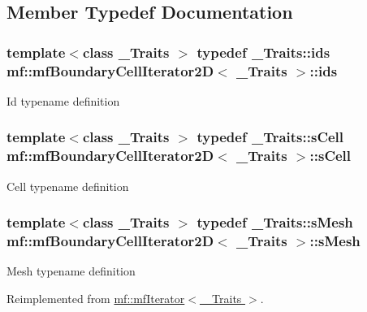 \subsection{Member Typedef Documentation}
\hypertarget{classmf_1_1mfBoundaryCellIterator2D_ac315487c67a3604069747dc93ccb2fa0}{
\subsubsection[{ids}]{\setlength{\rightskip}{0pt plus 5cm}template$<$class \_\-Traits $>$ typedef \_\-Traits::ids {\bf mf::mfBoundaryCellIterator2D}$<$ \_\-Traits $>$::{\bf ids}}}
\label{classmf_1_1mfBoundaryCellIterator2D_ac315487c67a3604069747dc93ccb2fa0}
Id typename definition \hypertarget{classmf_1_1mfBoundaryCellIterator2D_a3967d94a03a79073ae062491031e5339}{
\subsubsection[{sCell}]{\setlength{\rightskip}{0pt plus 5cm}template$<$class \_\-Traits $>$ typedef \_\-Traits::sCell {\bf mf::mfBoundaryCellIterator2D}$<$ \_\-Traits $>$::{\bf sCell}}}
\label{classmf_1_1mfBoundaryCellIterator2D_a3967d94a03a79073ae062491031e5339}
Cell typename definition \hypertarget{classmf_1_1mfBoundaryCellIterator2D_a4a2bc693e6241fee66020dd32ae7115e}{
\subsubsection[{sMesh}]{\setlength{\rightskip}{0pt plus 5cm}template$<$class \_\-Traits $>$ typedef \_\-Traits::sMesh {\bf mf::mfBoundaryCellIterator2D}$<$ \_\-Traits $>$::{\bf sMesh}}}
\label{classmf_1_1mfBoundaryCellIterator2D_a4a2bc693e6241fee66020dd32ae7115e}
Mesh typename definition 

Reimplemented from \hyperlink{classmf_1_1mfIterator_aca31e4d7e7eca4e3b100530d8725064b}{mf::mfIterator$<$ \_\-Traits $>$}.



